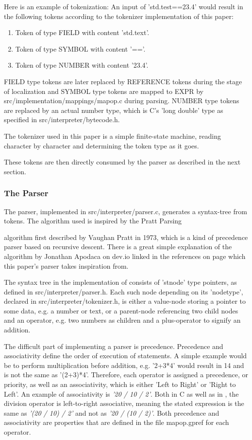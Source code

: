 \documentclass[12pt,a4paper]{article}
\newcommand{\cte}[1] {
    \cite{#1}
}
\begin{document}
Here is an example of tokenization:
An input of 'std.test==23.4' would result in the following tokens according
to the tokenizer implementation of this paper:
\begin{enumerate}
    \item Token of type FIELD with content 'std.text'.
    \item Token of type SYMBOL with content '=='.
    \item Token of type NUMBER with content '23.4'.
\end{enumerate}
FIELD type tokens are later replaced by REFERENCE tokens during the stage of localization
and SYMBOL type tokens are mapped to EXPR by src/implementation/mappings/mapop.c
during parsing. NUMBER type tokens are replaced by an actual number type, which
is C's 'long double' type as specified in src/interpreter/bytecode.h.

The tokenizer used in this paper is a simple finite-state machine, reading
character by character and determining the token type as it goes.

These tokens are then directly consumed by the parser as described in the next
section.

\subsubsection{The Parser}
The parser, implemented in src/interpreter/parser.c, generates a syntax-tree
from tokens. The algorithm used is inspired by the Pratt Parsing\cte{pratt}
algorithm first described by Vaughan Pratt in 1973, which is a kind of precedence
parser based on recursive descent. There is a great simple explanation of the algorithm
by Jonathan Apodaca on dev.io\cte{devio} linked in the references on page 
\pageref{bibliography} which this paper's parser takes inspiration from.

The syntax tree in the implementation of \name consists of 'stnode' type
pointers, as defined in src/interpreter/parser.h. Each such node depending
on its 'nodetype', declared in src/interpreter/tokenizer.h,
is either a value-node storing a pointer to some data, e.g. a number or text, or a
parent-node referencing two child nodes and an operator, e.g. two numbers as
children and a plus-operator to signify an addition.

The difficult part of implementing a parser is precedence. Precedence and
associativity define the order of execution of statements. A simple example
would be to perform multiplication before addition, e.g. '2+3*4' would
result in 14 and is not the same as '(2+3)*4'. Therefore, each operator is
assigned a precedence, or priority, as well as an associativity, which is
either 'Left to Right' or 'Right to Left'. An example of associativity is
\emph{'20 / 10 / 2'}. Both in C as well as in \name, the division operator is
left-to-right associative, meaning the stated expression is the same as
\emph{'(20 / 10) / 2'} and not as \emph{'20 / (10 / 2)'}. Both precedence 
and associativity are properties that are defined in the file mapop.gpref for
each operator.
\end{document}
